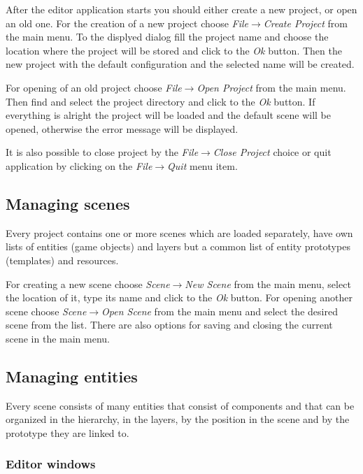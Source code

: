 After the editor application starts you should either create a new project, or open an old one. For the creation of a new project choose \emph{File}$\rightarrow$\emph{Create Project} from the main menu. To the displyed dialog fill the project name and choose the location where the project will be stored and click to the \emph{Ok} button. Then the new project with the default configuration and the selected name will be created.

For opening of an old project choose \emph{File}$\rightarrow$\emph{Open Project} from the main menu. Then find and select the project directory and click to the \emph{Ok} button. If everything is alright the project will be loaded and the default scene will be opened, otherwise the error message will be displayed.


It is also possible to close project by the \emph{File}$\rightarrow$\emph{Close Project} choice or quit application by clicking on the \emph{File}$\rightarrow$\emph{Quit} menu item.

\subsection{Managing scenes}

Every project contains one or more scenes which are loaded separately, have own lists of entities (game objects) and layers but a common list of entity prototypes (templates) and resources.

For creating a new scene choose \emph{Scene}$\rightarrow$\emph{New Scene} from the main menu, select the location of it, type its name and click to the \emph{Ok} button. For opening another scene choose \emph{Scene}$\rightarrow$\emph{Open Scene} from the main menu and select the desired scene from the list. There are also options for saving and closing the current scene in the main menu.

\subsection{Managing entities}

Every scene consists of many entities that consist of components and that can be organized in the hierarchy, in the layers, by the position in the scene and by the prototype they are linked to.

\subsubsection{Editor windows}

